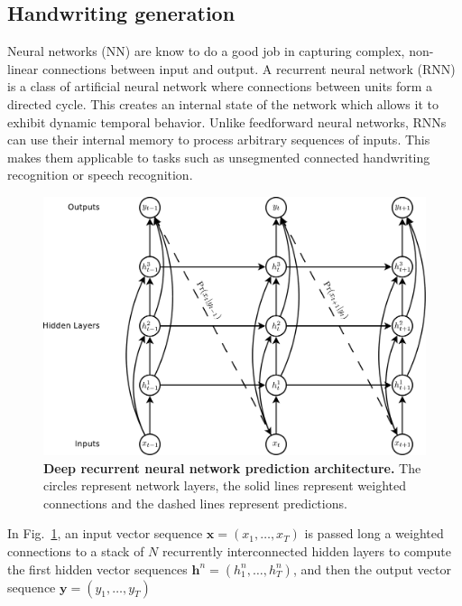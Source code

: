 \documentclass{article} %
\newcommand{\fref}[1]{Fig.~\ref{fig:#1}}
\newcommand{\flabel}[1]{\label{fig:#1}}
\begin{document}
\subsection{Handwriting generation}

Neural networks (NN) are know to do a good job in capturing complex, non-linear connections between input and output. A recurrent neural network (RNN) is a class of artificial neural network where connections between units form a directed cycle. This creates an internal state of the network which allows it to exhibit dynamic temporal behavior. Unlike feedforward neural networks, RNNs can use their internal memory to process arbitrary sequences of inputs. This makes them applicable to tasks such as unsegmented connected handwriting recognition or speech recognition. 

\begin{figure}[h]
\begin{center}
\includegraphics[scale = 0.3]{deep_predictor.pdf}
\caption{\textbf{Deep recurrent neural network prediction architecture.} The circles represent network layers, the solid lines represent weighted connections
and the dashed lines represent predictions. }
\flabel{deep_predictor}
\end{center}
\end{figure}

In \fref{deep_predictor}, an input vector sequence $\mathbf{x}=(x_1, \ldots, x_T)$ is passed long a weighted connections to a stack of $N$ recurrently interconnected hidden layers to compute the first hidden vector sequences $\mathbf{h}^n = (h^n_1,\ldots,h^n_T)$, and then the output vector sequence $\mathbf{y} = (y_1, \ldots, y_T)$
\end{document}
